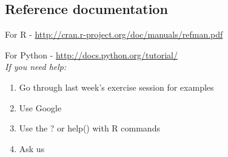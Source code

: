 \documentclass[a4paper,11pt]{article}
\begin{document}
\subsection{Reference documentation}
\normalsize For R - \url{http://cran.r-project.org/doc/manuals/refman.pdf}

For Python - \url{http://docs.python.org/tutorial/}\\

\emph{If you need help:}
\begin{enumerate}
\item Go through last week's exercise session for examples
\item Use Google
\item Use the ? or help() with R commands
\item Ask us
\end{enumerate}
\end{document}
